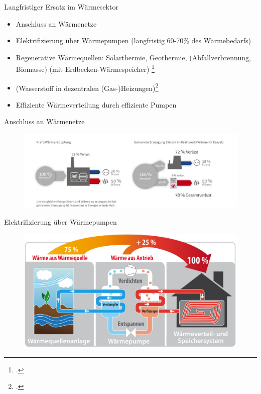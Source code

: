 \documentclass[10pt]{beamer}
\begin{document}
\begin{frame}{Langfristiger Ersatz im Wärmesektor}
 \begin{itemize} 
    \item Anschluss an Wärmenetze
    \item Elektrifizierung über Wärmepumpen (langfristig 60-70\% des Wärmebedarfs) 
    \item Regenerative Wärmequellen: Solarthermie, Geothermie, (Abfallverbrennung, Biomasse)
      (mit Erdbecken-Wärmespeicher) \footcite{clausen2022}
    \item (Wasserstoff in dezentralen (Gas-)Heizungen)\footcite{clausen2022}
    \item Effiziente Wärmeverteilung durch effiziente Pumpen 
 \end{itemize}
\end{frame}

\begin{frame}{Anschluss an Wärmenetze}
\begin{figure}
\includegraphics[width=\textwidth]{fig/kraft-waerme-kopplung.jpg}

\scriptsize{}
\end{figure}
\end{frame}


\begin{frame}{Elektrifizierung über Wärmepumpen}
\begin{figure}
\includegraphics[width=\textwidth]{fig/waermepumpe.png}

\scriptsize{}
\end{figure}
\end{frame}
\end{document}
